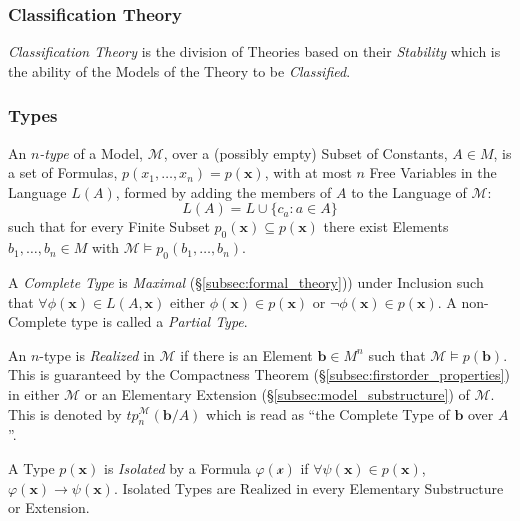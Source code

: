 \documentclass{article}
\begin{document}
\subsubsection{Classification Theory}

\emph{Classification Theory} is the division of Theories based on
their \emph{Stability} which is the ability of the Models of the
Theory to be \emph{Classified}.

\subsubsection{Types}

An \emph{$n$-type} of a Model, $\mathcal{M}$, over a (possibly empty)
Subset of Constants, $A \in M$, is a set of Formulas,
$p(x_1,\ldots,x_n) = p(\mathbf{x})$, with at most $n$ Free Variables
in the Language $L(A)$, formed by adding the members of $A$ to the
Language of $\mathcal{M}$:
\[
    L(A) = L \cup \{ c_a : a \in A \}
\]
such that for every Finite Subset $p_0(\mathbf{x}) \subseteq
p(\mathbf{x})$ there exist Elements $b_1,\ldots,b_n \in M$ with
$\mathcal{M} \vDash p_0(b_1,\ldots,b_n)$.

A \emph{Complete Type} is \emph{Maximal}
(\S\ref{subsec:formal_theory})) under Inclusion such that $\forall
\phi(\mathbf{x}) \in L(A,\mathbf{x})$ either $\phi(\mathbf{x}) \in
p(\mathbf{x})$ or $\neg \phi(\mathbf{x}) \in p(\mathbf{x})$. A
non-Complete type is called a \emph{Partial Type}.

An $n$-type is \emph{Realized} in $\mathcal{M}$ if there is an Element
$\mathbf{b} \in M^n$ such that $\mathcal{M} \vDash
p(\mathbf{b})$. This is guaranteed by the Compactness Theorem
(\S\ref{subsec:firstorder_properties}) in either $\mathcal{M}$ or an
Elementary Extension (\S\ref{subsec:model_substructure}) of
$\mathcal{M}$. This is denoted by $tp_{n}^{\mathcal{M}}(\mathbf{b}/A)$
which is read as ``the Complete Type of $\mathbf{b}$ over $A$''.

A Type $p(\mathbf{x})$ is \emph{Isolated} by a Formula
$\varphi(\mathcal{x})$ if $\forall \psi(\mathbf{x}) \in
p(\mathbf{x})$, $\varphi (\mathbf{x}) \rightarrow
\psi(\mathbf{x})$. Isolated Types are Realized in every Elementary
Substructure or Extension.
\end{document}
